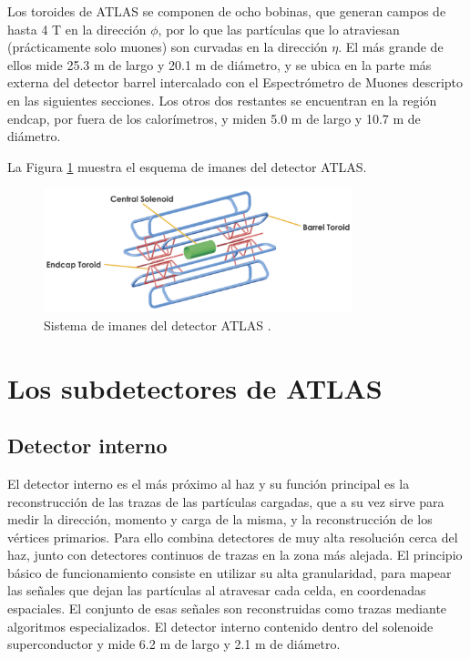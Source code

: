 Los toroides de ATLAS se componen de ocho bobinas, que generan campos de hasta 4 T 
en la dirección $\phi$, por lo que las partículas que lo atraviesan (prácticamente solo muones) son curvadas en la dirección $\eta$. El más grande de ellos mide 25.3 m de largo y 20.1 m de diámetro, y se ubica en la parte más externa del detector barrel intercalado con el Espectrómetro de Muones descripto en las siguientes secciones. Los otros dos restantes se encuentran en la región endcap, por fuera de los calorímetros, y miden 5.0 m de largo y 10.7 m de diámetro. 

La Figura \ref{fig:magnet_1} muestra el esquema de imanes del detector ATLAS.

\begin{figure}
\centering
  \includegraphics[width=0.8\textwidth]{images/lhc/magnet_1.png}
  \caption{Sistema de imanes del detector ATLAS \cite{magnet_system}.}
  \label{fig:magnet_1}
\end{figure}


\section{Los subdetectores de ATLAS}

\subsection{Detector interno}

El detector interno es el más próximo al haz y su función principal es la reconstrucción de las trazas de las partículas cargadas, que a su vez sirve para medir la dirección, momento y carga de la misma, y la reconstrucción de los vértices primarios. Para ello combina detectores de muy alta resolución cerca del haz, junto con detectores continuos de trazas en la zona más alejada. El principio básico de funcionamiento consiste en utilizar su alta granularidad, para mapear las señales que dejan las partículas al atravesar cada celda, en coordenadas espaciales. El conjunto de esas señales son reconstruidas como trazas mediante algoritmos especializados. El detector interno contenido dentro del solenoide superconductor y mide 6.2 m de largo y 2.1 m de diámetro. 

